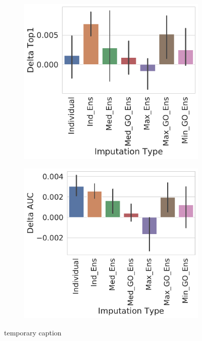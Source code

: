 \documentclass[journal=jmcmar,manuscript=article]{achemso}
\begin{document}
\begin{figure}[tbph]
    \begin{subfigure}[t]{0.48\textwidth}
        \centering
        \includegraphics[width=\linewidth]{figures/ComparingImpStylesTop1.pdf}
    \end{subfigure}
    \hfill
    \begin{subfigure}[t]{0.48\textwidth}
        \centering
        \includegraphics[width=\linewidth]{figures/ComparingImpStylesAUC.pdf}
    \end{subfigure}
    \caption{temporary caption}
    \label{fig:compareImp}
\end{figure}
\end{document}
